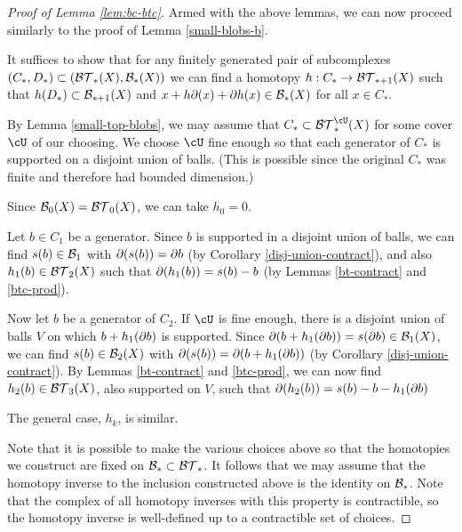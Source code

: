 \begin{proof}[Proof of Lemma \ref{lem:bc-btc}]
Armed with the above lemmas, we can now proceed similarly to the proof of Lemma \ref{small-blobs-b}.

It suffices to show that for any finitely generated pair of subcomplexes 
$(C_*, D_*) \subset ({\mathcal{BT}}_*(X), {\mathcal B}_*(X))$
we can find a homotopy $h:C_*\to {\mathcal{BT}}_{*+1}(X)$ such that $h(D_*) \subset {\mathcal B}_{*+1}(X)$
and $x + h\partial(x) + \partial h(x) \in {\mathcal B}_*(X)$ for all $x\in C_*$.

By Lemma \ref{small-top-blobs}, we may assume that $C_* \sub \btc_*^\cU(X)$ for some
cover $\cU$ of our choosing.
We choose $\cU$ fine enough so that each generator of $C_*$ is supported on a disjoint union of balls.
(This is possible since the original $C_*$ was finite and therefore had bounded dimension.)

Since ${\mathcal B}_0(X) = {\mathcal{BT}}_0(X)$, we can take $h_0 = 0$.

Let $b \in C_1$ be a generator.
Since $b$ is supported in a disjoint union of balls,
we can find $s(b)\in {\mathcal B}_1$ with $\partial (s(b)) = \partial b$
(by Corollary \ref{disj-union-contract}), and also $h_1(b) \in {\mathcal{BT}}_2(X)$
such that $\partial (h_1(b)) = s(b) - b$
(by Lemmas \ref{bt-contract} and \ref{btc-prod}).

Now let $b$ be a generator of $C_2$.
If $\cU$ is fine enough, there is a disjoint union of balls $V$
on which $b + h_1(\partial b)$ is supported.
Since $\partial(b + h_1(\partial b)) = s(\partial b) \in {\mathcal B}_1(X)$, we can find
$s(b)\in {\mathcal B}_2(X)$ with $\partial(s(b)) = \partial(b + h_1(\partial b))$ (by Corollary \ref{disj-union-contract}).
By Lemmas \ref{bt-contract} and \ref{btc-prod}, we can now find
$h_2(b) \in {\mathcal{BT}}_3(X)$, also supported on $V$, such that $\partial(h_2(b)) = s(b) - b - h_1(\partial b)$

The general case, $h_k$, is similar.

Note that it is possible to make the various choices above so that the homotopies we construct
are fixed on ${\mathcal B}_* \subset {\mathcal{BT}}_*$.
It follows that we may assume that
the homotopy inverse to the inclusion constructed above is the identity on ${\mathcal B}_*$.
Note that the complex of all homotopy inverses with this property is contractible, 
so the homotopy inverse is well-defined up to a contractible set of choices.
\end{proof}





